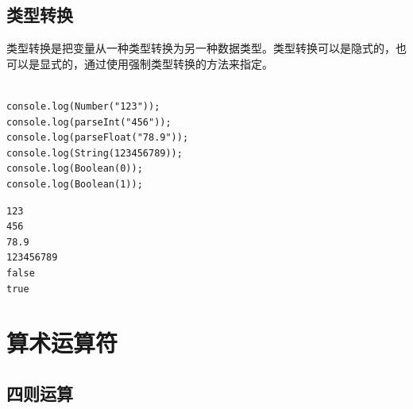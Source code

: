 \subsection{类型转换}

类型转换是把变量从一种类型转换为另一种数据类型。类型转换可以是隐式的，也可以是显式的，通过使用强制类型转换的方法来指定。 \\

 \\

\begin{lstlisting}[style=htmlcssjs]
console.log(Number("123"));
console.log(parseInt("456"));
console.log(parseFloat("78.9"));
console.log(String(123456789));
console.log(Boolean(0));
console.log(Boolean(1));
\end{lstlisting}

\begin{tcolorbox}
	\begin{verbatim}
123
456
78.9
123456789
false
true
	\end{verbatim}
\end{tcolorbox}

\newpage

\section{算术运算符}

\subsection{四则运算}

\begin{table}[H]
	\centering
	\caption{四则运算}
\end{table}

